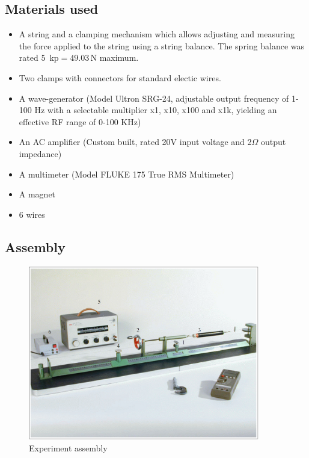 \documentclass{scrreprt}
\newcommand{\unit}[1]{\ensuremath{\, \mathrm{#1}}}
\begin{document}
\subsection{Materials used}
\begin{itemize}
  \item A string and a clamping mechanism which allows adjusting and measuring the force applied to the string using a string balance. The spring balance was rated 5 $\unit{kp} = 49.03\unit{N}$ maximum.
  \item Two clamps with connectors for standard electic wires.
  \item A wave-generator (Model Ultron SRG-24, adjustable output frequency of 1-100 Hz with a selectable multiplier x1, x10, x100 and x1k, yielding an effective RF range of 0-100 KHz)
  \item An AC amplifier (Custom built, rated 20V input voltage and 2$\Omega$ output impedance)
  \item A multimeter (Model FLUKE 175 True RMS Multimeter)
  \item A magnet
  \item 6 wires
\end{itemize}

\subsection{Assembly}

\begin{figure}[H]
\center
\includegraphics[width=0.9\textwidth]{img/WaveSetup.PNG}
\caption{Experiment assembly \cite[p. 73]{physcript13}}
\end{figure}
\end{document}
